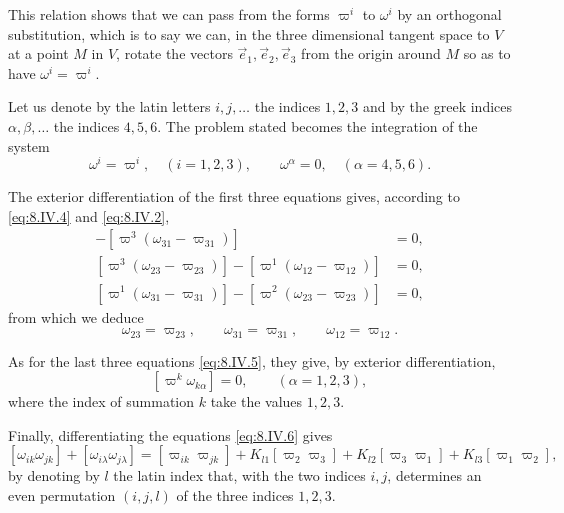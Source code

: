 \documentclass[leqno,11pt]{book}
\numberwithin{equation}{chapter}
\theoremstyle{shape1}
\theoremstyle{shape0}
\theoremstyle{shape2}
\theoremstyle{definition}
\begin{document}
This relation shows that we can pass from the forms $\varpi^{i}$ to $\omega^{i}$ by an orthogonal substitution, which is to say we can, in the three dimensional tangent space to $V$ at a point $M$ in $V$, rotate the vectors $\vec e_{1},\vec e_{2},\vec e_{3}$ from the origin around $M$ so as to have $\omega^{i}=\varpi^{i}$.

Let us denote by the latin letters $i,j,\dots$ the indices $1,2,3$ and by the greek indices $\alpha,\beta,\dots$ the indices $4,5,6$. The problem stated becomes the integration of the system
\begin{equation}
  \label{eq:8.IV.5}\tag{IV, 5}
  \omega^{i}=\varpi^{i},\quad(i=1,2,3),\qquad\omega^{\alpha}=0,\quad(\alpha=4,5,6).
\end{equation}

The exterior differentiation of the first three equations gives, according to \eqref{eq:8.IV.4} and \eqref{eq:8.IV.2},
\begin{align*}
  [\varpi^{2}(\omega_{12}-\varpi_{12})]-[\varpi^{3}(\omega_{31}-\varpi_{31})]&=0,\\
  [\varpi^{3}(\omega_{23}-\varpi_{23})]-[\varpi^{1}(\omega_{12}-\varpi_{12})]&=0,\\
  [\varpi^{1}(\omega_{31}-\varpi_{31})]-[\varpi^{2}(\omega_{23}-\varpi_{23})]&=0,
\end{align*}
from which we deduce
\begin{equation}
  \label{eq:8.IV.6}\tag{IV, 6}
  \omega_{23}=\varpi_{23},\qquad\omega_{31}=\varpi_{31},\qquad\omega_{12}=\varpi_{12}.
\end{equation}

As for the last three equations \eqref{eq:8.IV.5}, they give, by exterior differentiation,
\[
[\varpi^{k}\omega_{k\alpha}]=0,\qquad(\alpha=1,2,3),
\]
where the index of summation $k$ take the values $1,2,3$.

Finally, differentiating the equations \eqref{eq:8.IV.6} gives
\[
[\omega_{ik}\omega_{jk}]+[\omega_{i\lambda}\omega_{j\lambda}]=[\varpi_{ik}\varpi_{jk}]+K_{l1}[\varpi_{2}\varpi_{3}]+K_{l2}[\varpi_{3}\varpi_{1}]+K_{l3}[\varpi_{1}\varpi_{2}],
\]
by denoting by $l$ the latin index that, with the two indices $i,j$, determines an even permutation $(i,j,l)$ of the three indices $1,2,3$.
\end{document}
